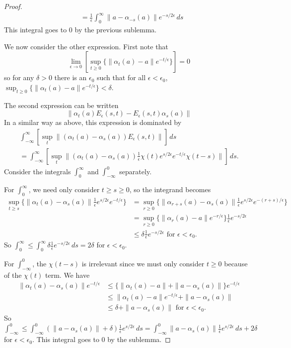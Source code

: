 \documentclass{book}
\begin{document}
\begin{proof}
\begin{align*}
    &=\frac{1}{\epsilon}\int_0^\infty\|a-\alpha_{-s}(a)\|e^{-s/2\epsilon}\,ds
  \end{align*}
  This integral goes to \(0\) by the previous sublemma.\par
  We now consider the other expression. First note that
  \[
    \lim_{\epsilon\to0}[\sup_{t\geq0}\{\|\alpha_t(a)-a\|e^{-t/\epsilon}\}]=0
  \]
  so for any \(\delta>0\) there is an \(\epsilon_0\) such that for all \(\epsilon<\epsilon_0\), \(\sup_{t\geq0}\{\|\alpha_t(a)-a\|e^{-t/\epsilon}\}<\delta\).\par
  The second expression can be written
  \[
    \|\alpha_t(a)E_\epsilon(s,t)-E_\epsilon(s,t)\alpha_s(a)\|
  \]
  In a similar way as above, this expression is dominated by
  \begin{align*}
    \int_{-\infty}^\infty[\sup_{t}\|(\alpha_t(a)-\alpha_s(a))E_\epsilon(s,t)\|]\,ds\\
    =\int_{-\infty}^\infty[\sup_t\|(\alpha_t(a)-\alpha_s(a))\frac{1}{\epsilon}\chi(t)e^{s/2\epsilon}e^{-t/\epsilon}\chi(t-s)\|]\,ds.
  \end{align*}
  Consider the integrals \(\int_{0}^\infty\) and \(\int_{-\infty}^0\) separately.\par
  For \(\int_0^\infty\), we need only consider \(t\geq s\geq0\), so the integrand becomes
  \begin{align*}
    \sup_{t\geq s}\{\|\alpha_t(a)-\alpha_s(a)\|\frac{1}{\epsilon}e^{s/2\epsilon}e^{-t/\epsilon}\}&=\sup_{r\geq0}\{\|\alpha_{r+s}(a)-\alpha_s(a)\|\frac{1}{\epsilon}e^{s/2\epsilon}e^{-(r+s)/\epsilon}\}\\
    &=\sup_{r\geq0}\{\|\alpha_r(a)-a\|e^{-r/\epsilon}\}\frac{1}{\epsilon}e^{-s/2\epsilon}\\
    &\leq\delta\frac{1}{\epsilon}e^{-s/2\epsilon}\text{ for }\epsilon<\epsilon_0.
  \end{align*}
  So \(\int_0^\infty\leq\int_0^\infty\delta\frac{1}{\epsilon}e^{-s/2\epsilon}\,ds=2\delta\) for \(\epsilon<\epsilon_0\).\par
  For \(\int_{-\infty}^0\), the \(\chi(t-s)\) is irrelevant since we must only consider \(t\geq0\) because of the \(\chi(t)\) term. We have
  \begin{align*}
    \|\alpha_t(a)-\alpha_s(a)\|e^{-t/\epsilon}&\leq\{\|\alpha_t(a)-a\|+\|a-\alpha_s(a)\|\}e^{-t/\epsilon}\\
    &\leq\|\alpha_t(a)-a\|e^{-t/\epsilon}+\|a-\alpha_s(a)\|\\
    &\leq\delta+\|a-\alpha_s(a)\|\text{ for }\epsilon<\epsilon_0.
  \end{align*}
  So \(\int_{-\infty}^0\leq\int_{-\infty}^0(\|a-\alpha_s(a)\|+\delta)\frac{1}{\epsilon}e^{s/2\epsilon}\,ds=\int_{-\infty}^0\|a-\alpha_s(a)\|\frac{1}{\epsilon}e^{s/2\epsilon}\,ds+2\delta\) for \(\epsilon<\epsilon_0\).
  This integral goes to \(0\) by the sublemma.
\end{proof}
\end{document}
